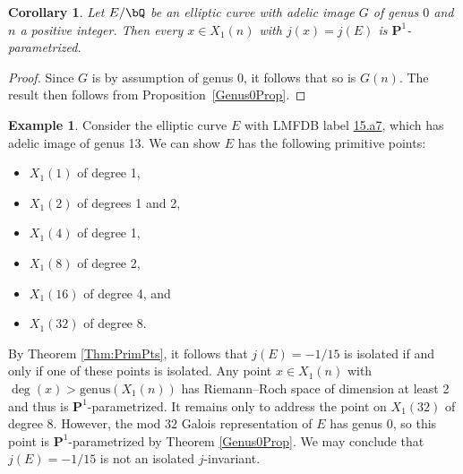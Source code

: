 \documentclass[11pt,reqno]{amsart}
\theoremstyle{plain}
\newtheorem{corollary}[theorem]{Corollary}
\theoremstyle{definition}
\newtheorem{example}[theorem]{Example}
\newcommand{\Q}{\bQ}
\newcommand{\PP}{\mathbf P}
\begin{document}
\begin{corollary}
Let $E/\Q$ be an elliptic curve with adelic image $G$ of genus $0$ and $n$ a positive integer. %
Then 
every $x \in X_1(n)$ with $j(x) = j(E)$ is $\PP^1$-parametrized.
\end{corollary}
\begin{proof}
Since $G$ is by assumption of genus $0$, it follows that so is $G(n)$. The result then follows from Proposition~\ref{Genus0Prop}.
\end{proof}




\begin{example}\label{eg:modngenus0}
  Consider the elliptic curve $E$ with LMFDB label \href{https://www.lmfdb.org/EllipticCurve/Q/15/a/7}{15.a7}, which has adelic image of genus 13. We can show $E$ has the following primitive points:
\begin{itemize}
    \item $X_1(1)$ of degree 1,
    \item $X_1(2)$ of degrees 1 and 2,
    \item $X_1(4)$ of degree 1,
    \item $X_1(8)$ of degree 2,
    \item $X_1(16)$ of degree 4, and
    \item $X_1(32)$ of degree 8.
\end{itemize}
By Theorem \ref{Thm:PrimPts}, it follows that $j(E)=-1/15$ is isolated if and only if one of these points is isolated. Any point $x \in X_1(n)$ with $\deg(x)>\text{genus}(X_1(n))$ has Riemann--Roch space of dimension at least 2 and thus is $\PP^1$-parametrized. It remains only to address the point on $X_1(32)$ of degree 8. However, the mod $32$ Galois representation of $E$ has genus $0$, so this point is $\PP^1$-parametrized by Theorem \ref{Genus0Prop}. We may conclude that $j(E)=-1/15$ is not an isolated $j$-invariant.
\end{example}
\end{document}
